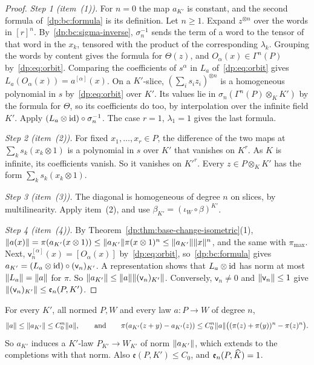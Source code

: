 \begin{proof}
\emph{Step 1 (item~(1)).} For $n=0$ the map $a_{K'}$ is constant, and the second formula of~\eqref{dp:bc:formula} is its definition. Let $n\ge1$. Expand $z^{\otimes n}$ over the words in $[r]^n$. By~\eqref{dp:bc:sigma-inverse}, $\sigma_n^{-1}$ sends the term of a word to the tensor of that word in the $x_k$, tensored with the product of the corresponding $\lambda_k$. Grouping the words by content gives the formula for $\Theta(z)$, and $O_\alpha(x)\in\Gamma^n(P)$ by~\eqref{dp:eq:orbit}. Comparing the coefficients of $s^\alpha$ in $L_a$ of~\eqref{dp:eq:orbit} gives $L_a(O_\alpha(x))=a^{[\alpha]}(x)$. On a $K'$-slice, $(\sum_is_iz_i)^{\otimes n}$ is a homogeneous polynomial in $s$ by~\eqref{dp:eq:orbit} over $K'$. Its values lie in $\sigma_n(\Gamma^n(P)\otimes_KK')$ by the formula for $\Theta$, so its coefficients do too, by interpolation over the infinite field $K'$. Apply $(L_a\otimes\mathrm{id})\circ\sigma_n^{-1}$. The case $r=1$, $\lambda_1=1$ gives the last formula.

\emph{Step 2 (item~(2)).} For fixed $x_1,\dots,x_r\in P$, the difference of the two maps at $\sum_ks_k(x_k\otimes1)$ is a polynomial in $s$ over $K'$ that vanishes on $K^r$. As $K$ is infinite, its coefficients vanish. So it vanishes on $K'^r$. Every $z\in P\otimes_KK'$ has the form $\sum_ks_k(x_k\otimes1)$.

\emph{Step 3 (item~(3)).} The diagonal is homogeneous of degree $n$ on slices, by multilinearity. Apply item~(2), and use $\beta_{K'}=(\iota_W\circ\beta)^{K'}$.

\emph{Step 4 (item~(4)).} By Theorem~\ref{dp:thm:base-change-isometric}(1), $\lVert a(x)\rVert=\pi(a_{K'}(x\otimes1))\le\lVert a_{K'}\rVert\pi(x\otimes1)^n\le\lVert a_{K'}\rVert\lVert x\rVert^n$, and the same with $\pi_{\max}$. Next, $\mathsf v_n^{[\alpha]}(x)=[O_\alpha(x)]$ by~\eqref{dp:eq:orbit}, so~\eqref{dp:bc:formula} gives $a_{K'}=(L_a\otimes\mathrm{id})\circ(\mathsf v_n)_{K'}$. A representation shows that $L_a\otimes\mathrm{id}$ has norm at most $\lVert L_a\rVert=\lVert a\rVert$ for $\pi$. So $\lVert a_{K'}\rVert\le\lVert a\rVert\lVert (\mathsf v_n)_{K'}\rVert$. Conversely, $\mathsf v_n\ne0$ and $\lVert \mathsf v_n\rVert\le1$ give $\lVert (\mathsf v_n)_{K'}\rVert\le\mathfrak e_n(P,K')$.
\end{proof}

\begin{theorem}\label{dp:thm:base-change-law}
For every $K'$, all normed $P,W$ and every law $a\colon P\to W$ of degree $n$,
\begin{equation}\label{dp:bc:bound}
 \lVert a\rVert\le\lVert a_{K'}\rVert\le C_0^n\lVert a\rVert,\qquad\text{and}\qquad\pi(a_{K'}(z+y)-a_{K'}(z))\le C_0^n\lVert a\rVert\bigl((\pi(z)+\pi(y))^n-\pi(z)^n\bigr).
\end{equation}
So $a_{K'}$ induces a $K'$-law $P_{K'}\to W_{K'}$ of norm $\lVert a_{K'}\rVert$, which extends to the completions with that norm. Also $\mathfrak e(P,K')\le C_0$, and $\mathfrak e_n(P,\widehat K)=1$.
\end{theorem}

